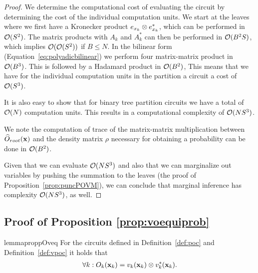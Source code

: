\begin{proof}
	We determine the computational cost of evaluating the circuit by determining the cost of the individual computation units. We start at the leaves where we first have a Kronecker product $ e_{x_k} \otimes  e_{x_k}^*$, which can be performed in $\mathcal{O} (S^2)$.
	The matrix products with $A_k$ and $A_k^*$ can then be performed in $\mathcal{O} (B^2 S)$, which implies $\mathcal{O}(\mathcal{O} (S^2))$ if $B\leq N$.
	In the bilinear form (\cf Equation~\ref{eq:polyadicbilinear}) we perform four matrix-matrix product in $\mathcal{O} (B^3)$. This is followed by a Hadamard product in $\mathcal{O} (B^2)$,
	This means that we have for the individual computation units in the partition a circuit a cost of $\mathcal{O} (S^3)$.

	It is also easy to show that for binary tree partition circuits we have a total of $\mathcal{O} (N)$ computation units. This results in a computational complexity of $\mathcal{O} (N  S^3)$.

	We note the computation of trace of the matrix-matrix multiplication between $\widehat{O}_{root}(\mathbf{x})$ and the density matrix $\rho$ necessary for obtaining a probability can be done in $\mathcal{O}(B^2)$.

	Given that we can evaluate \puncs $\mathcal{O} ( N S^3)$ and also that we can marginalize out variables by pushing the summation to the leaves (\cf the proof of Proposition~\ref{prop:puncPOVM}), we can conclude that marginal inference has complexity $\mathcal{O}(N S^3)$, as well.
\end{proof}




\subsection{Proof of Proposition \ref{prop:voequiprob}}
\label{sec:proof:prop:voequiprob}

\begin{restatable}{lemma}{proppOveq}
	For the circuits defined in Definition~\ref{def:poc} and Definition~\ref{def:vpoc} it holds that
	\label{prop:Oveq}
	\begin{align}
		\forall k: O_k(\mathbf{x}_k) = v_{k}(\mathbf{x}_{k}) \otimes v^*_{k}(\mathbf{x}_{k}).
		\label{eq:def:opvec_equivalent}
	\end{align}
\end{restatable}


